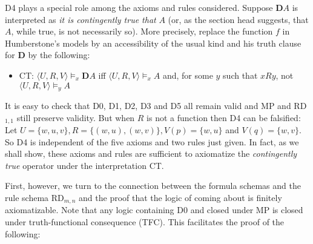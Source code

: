 \documentclass[11pt]{article}
\begin{document}
D4 plays a special role among the axioms and rules considered. Suppose $\mathbf{D}{A}$ is interpreted as \textit{it is contingently true that} $A$ (or, as the section head suggests, that $A$, while true, is not necessarily so). More precisely, replace the function $f$ in Humberstone's models by an accessibility of the usual kind and his truth clause for $\mathbf{D}$ by the following\footnotemark:
\begin{itemize}[label={}]
\item{
CT: $\langle U,R,V\!\rangle  \models _x \mathbf{D}A$ iff $\langle U,R,V\!\rangle  \models _x A$ and, for some $y$ such that $xRy$, not $\langle U,R,V\!\rangle \models _y A$
}
\end{itemize}


It is easy to check that D0, D1, D2, D3 and D5 all remain valid and MP and RD$_{1,1}$ still preserve validity. But when $R$ is not a function then D4 can be falsified: Let $U=\{w,u,v\}, R=\{(w,u),(w,v)\}, V(p)=\{w,u\}$ and $V(q)=\{w,v\}$. So D4 is independent of the five axioms and two rules just given. In fact, as we shall show, these axioms and rules are sufficient to axiomatize the \textit{contingently true} operator under the interpretation CT. 

First, however, we turn to the connection between the formula schemas and the rule schema RD$_{m,n}$ and the proof that the logic of coming about is finitely axiomatizable. Note that any logic containing D0 and closed under MP is closed under truth-functional consequence (TFC). This facilitates the proof of the following:
\end{document}
